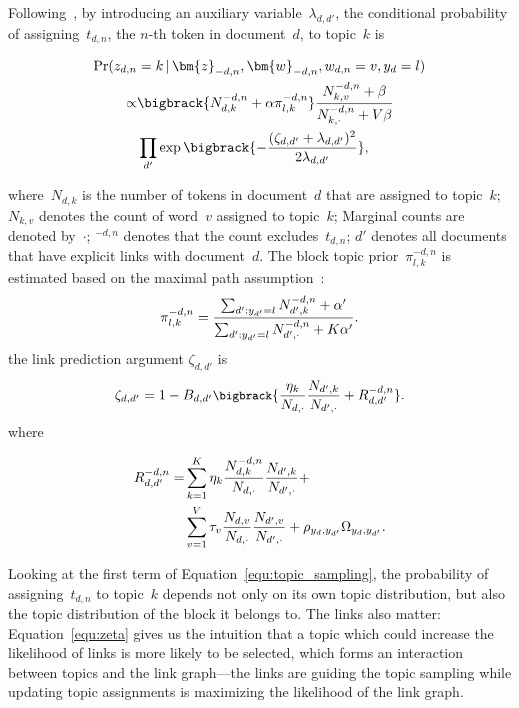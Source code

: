 Following~, by introducing an auxiliary
variable~$\lambda_{d,d'}$, the conditional probability of assigning~$t_{d,n}$, the $n$-th token in document~$d$, to topic~$k$
is\par\nobreak
\begin{small}
\begin{align}
\Pr (z_{d,n}&=k \,|\,\bm{z}_{-d,n}, \bm{w}_{-d,n}, w_{d,n}=v, y_d=l) \notag\\
\propto&\bigbrack{N_{d,k}^{-d,n} + \alpha \pi_{l,k}^{-d,n}} \frac {N_{k,v}^{-d,n} + \beta} {N_{k,\cdot}^{-d,n} + V\beta} \notag\\
&\prod_{d'} \exp \bigbrack{- \frac {(\zeta_{d,d'}+\lambda_{d,d'})^2} {2\lambda_{d,d'}}}, \label{equ:topic_sampling}
\end{align}
\end{small}
where~$N_{d,k}$ is the number of tokens in document~$d$ that are
assigned to topic~$k$; $N_{k,v}$ denotes the count of word~$v$
assigned to topic~$k$; Marginal counts are denoted by~$\cdot$;
$^{-d,n}$ denotes that the count excludes~$t_{d,n}$; $d'$ denotes all
documents that have explicit links with document~$d$.  The block topic
prior~$\pi_{l,k}^{-d,n}$ is estimated based on the maximal path
assumption~\cite{cowans-2006-thesis,wallach-2008-thesis}:
\begin{equation}\label{equ:pi}
\small
\pi_{l,k}^{-d,n} = \frac {\sum_{d': y_{d'}=l} N_{d',k}^{-d,n} + \alpha'} {\sum_{d': y_{d'}=l} N_{d',\cdot}^{-d,n} + K\alpha'}.
\end{equation}
the link prediction argument $\zeta_{d,d'}$ is
\begin{equation}\label{equ:zeta}
\small
\zeta_{d,d'} = 1 - B_{d,d'} \bigbrack{\frac{\eta_k}{N_{d,\cdot}} \frac{N_{d',k}}{N_{d',\cdot}} + R_{d,d'}^{-d,n}}.
\end{equation}
where\par\nobreak
\begin{small}
\begin{align}
R_{d,d'}^{-d,n} =& \sum_{k=1}^{K} \eta_{k} \frac{N_{d,k}^{-d,n}}{N_{d,\cdot}} \frac{N_{d',k}}{N_{d',\cdot}} + \notag\\
&\sum_{v=1}^{V} \tau_{v} \frac{N_{d,v}}{N_{d,\cdot}} \frac{N_{d',v}}{N_{d',\cdot}} + \rho_{y_d, y_{d'}} \Omega_{y_d, y_{d'}}.
\end{align}
\end{small}

Looking at the first term of Equation~\ref{equ:topic_sampling}, the
probability of assigning~$t_{d,n}$ to topic~$k$ depends not only on
its own topic distribution, but also the topic distribution of the
block it belongs to.  The links also matter: Equation~\ref{equ:zeta}
gives us the intuition that a topic which could increase the
likelihood of links is more likely to be selected, which forms an
interaction between topics and the link graph---the links are guiding
the topic sampling while updating topic assignments is maximizing the
likelihood of the link graph.

